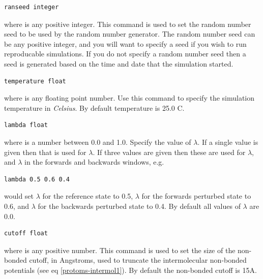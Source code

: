\documentclass[letterpaper,10pt,english]{sphinxmanual}
\begin{document}
\begin{Verbatim}[commandchars=\\\{\}]
ranseed integer
\end{Verbatim}

where  is any positive integer. This command is used to set the random number seed to be used by the random number generator. The random number seed can be any positive integer, and you will want to specify a seed if you wish to run reproducable simulations. If you do not specify a random number seed then a seed is generated based on the time and date that the simulation started.

\begin{Verbatim}[commandchars=\\\{\}]
temperature float
\end{Verbatim}

where  is any floating point number. Use this command to specify the simulation temperature in \emph{Celsius}. By default temperature is 25.0 C.

\begin{Verbatim}[commandchars=\\\{\}]
lambda float
\end{Verbatim}

where  is a number between 0.0 and 1.0. Specify the value of \(\lambda\). If a single value is given then that is used for \(\lambda\). If three values are given then these are used for \(\lambda\), and \(\lambda\) in the forwards and backwards windows, e.g.

\begin{Verbatim}[commandchars=\\\{\}]
lambda 0.5 0.6 0.4
\end{Verbatim}

would set \(\lambda\) for the reference state to 0.5, \(\lambda\) for the forwards perturbed state to 0.6, and \(\lambda\) for the backwards perturbed state to 0.4. By default all values of \(\lambda\) are 0.0.

\begin{Verbatim}[commandchars=\\\{\}]
cutoff float
\end{Verbatim}

where  is any positive number. This command is used to set the size of the non-bonded cutoff, in Angstroms, used to truncate the intermolecular non-bonded potentials (see eq \eqref{protoms-intermol1}). By default the non-bonded cutoff is 15A.
\end{document}
